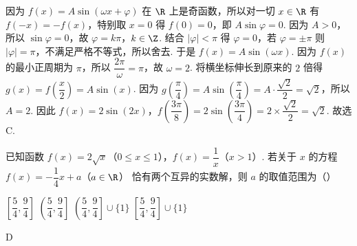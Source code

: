 \begin{solution}
因为 \(f\left(x\right)=A\sin\left(\omega x+\varphi\right)\) 在 \(\R\) 上是奇函数，所以对一切 \(x\in\R\) 有 \(f\left(-x\right)=-f\left(x\right)\)，特别取 \(x=0\) 得 \(f\left(0\right)=0\)，即 \(A\sin\varphi=0\). 因为 \(A>0\)，所以 \(\sin\varphi=0\)，故 \(\varphi=k\pi\)，\(k\in\Z\). 结合 \(\left|\varphi\right|<\pi\) 得 \(\varphi=0\)，若 \(\varphi=\pm\pi\) 则 \(\left|\varphi\right|=\pi\)，不满足严格不等式，所以舍去. 于是 \(f\left(x\right)=A\sin\left(\omega x\right)\). 因为 \(f\left(x\right)\) 的最小正周期为 \(\pi\)，所以 \(\dfrac{2\pi}{\omega}=\pi\)，故 \(\omega=2\). 将横坐标伸长到原来的 \(2\) 倍得 \(g\left(x\right)=f\left(\dfrac{x}{2}\right)=A\sin\left(x\right)\). 因为 \(g\left(\dfrac{\pi}{4}\right)=A\sin\left(\dfrac{\pi}{4}\right)=A\cdot\dfrac{\sqrt{2}}{2}=\sqrt{2}\)，所以 \(A=2\). 因此 \(f\left(x\right)=2\sin\left(2x\right)\)，\(f\left(\dfrac{3\pi}{8}\right)=2\sin\left(\dfrac{3\pi}{4}\right)=2\times\dfrac{\sqrt{2}}{2}=\sqrt{2}\). 故选 C.
\end{solution}

\begin{problem}
已知函数 \(f(x)=2\sqrt{x}\)（\(0\le x\le 1\)），\(f(x)=\dfrac1x\)（\(x>1\)）. 若关于 \(x\) 的方程 \(f(x)=-\dfrac14x+a\)（\(a\in\R\)） 恰有两个互异的实数解，则 \(a\) 的取值范围为（\quad）

\choices
    {\(\left[\dfrac54,\dfrac94\right]\)}
    {\(\left(\dfrac54,\dfrac94\right]\)}
    {\(\left(\dfrac54,\dfrac94\right]\cup\{1\}\)}
    {\(\left[\dfrac54,\dfrac94\right]\cup\{1\}\)}
\end{problem}

\begin{answer}
D
\end{answer}

